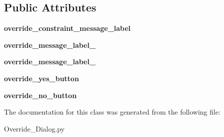 \subsection*{Public Attributes}
\begin{DoxyCompactItemize}
\item 
\hypertarget{classOverride__Dialog_1_1Ui__Override__Dialog_a3a70416e65bf2f2e266b66479a60bafb}{{\bfseries override\-\_\-constraint\-\_\-message\-\_\-label}}\label{classOverride__Dialog_1_1Ui__Override__Dialog_a3a70416e65bf2f2e266b66479a60bafb}

\item 
\hypertarget{classOverride__Dialog_1_1Ui__Override__Dialog_a93ffe5d03193b6c015ee6e9d1468238a}{{\bfseries override\-\_\-message\-\_\-label\-\_}}\label{classOverride__Dialog_1_1Ui__Override__Dialog_a93ffe5d03193b6c015ee6e9d1468238a}

\item 
\hypertarget{classOverride__Dialog_1_1Ui__Override__Dialog_ae0f8a6fa2b82197fad83e4bb8e1d2aea}{{\bfseries override\-\_\-message\-\_\-label\-\_}}\label{classOverride__Dialog_1_1Ui__Override__Dialog_ae0f8a6fa2b82197fad83e4bb8e1d2aea}

\item 
\hypertarget{classOverride__Dialog_1_1Ui__Override__Dialog_a194eaea83a5fad0ed64bae1cb48493a2}{{\bfseries override\-\_\-yes\-\_\-button}}\label{classOverride__Dialog_1_1Ui__Override__Dialog_a194eaea83a5fad0ed64bae1cb48493a2}

\item 
\hypertarget{classOverride__Dialog_1_1Ui__Override__Dialog_a1284c82be077bfe864987ec1c84f1d18}{{\bfseries override\-\_\-no\-\_\-button}}\label{classOverride__Dialog_1_1Ui__Override__Dialog_a1284c82be077bfe864987ec1c84f1d18}

\end{DoxyCompactItemize}


The documentation for this class was generated from the following file\-:\begin{DoxyCompactItemize}
\item 
Override\-\_\-\-Dialog.\-py\end{DoxyCompactItemize}
